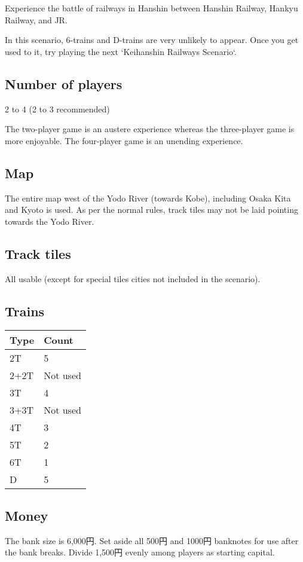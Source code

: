 \documentclass{article}
\begin{document}
\begin{CJK}{UTF8}{min}
\begin{multicols}{2}
Experience the battle of railways in Hanshin between Hanshin Railway,
Hankyu Railway, and JR.

In this scenario, 6-trains and D-trains are very unlikely to
appear. Once you get used to it, try playing the next `Keihanshin
Railways Scenario`.

\subsection{Number of players}

2 to 4 (2 to 3 recommended)

The two-player game is an austere experience whereas the three-player
game is more enjoyable. The four-player game is an unending
experience.

\subsection{Map}

The entire map west of the Yodo River (towards Kobe), including Osaka
Kita and Kyoto is used. As per the normal rules, track tiles may not be laid
pointing towards the Yodo River.

\subsection{Track tiles}

All usable (except for special tiles cities not included in the scenario).

\subsection{Trains}
\begin{tabular}{ll}
Type & Count \\
\hline
2T & 5\\
2+2T & Not used\\
3T & 4 \\
3+3T & Not used \\
4T & 3 \\
5T & 2 \\
6T & 1 \\
D & 5
\end{tabular}

\subsection{Money}
The bank size is 6,000円. Set aside all 500円 and 1000円
banknotes for use after the bank breaks. Divide 1,500円 evenly
among players as starting capital.


\end{multicols}
\end{CJK}
\end{document}
